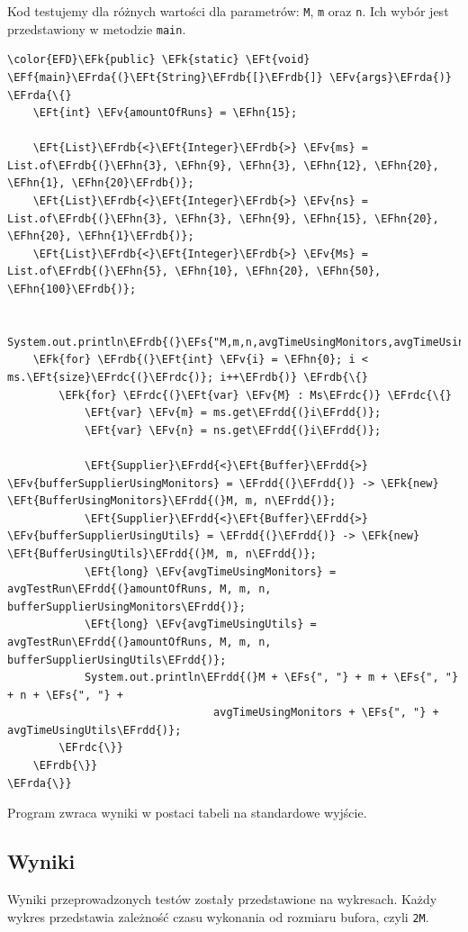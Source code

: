 \documentclass[11pt]{article}
\newcommand{\EFs}[1]{\textcolor{EFs}{#1}} %
\newcommand{\EFk}[1]{\textcolor{EFk}{#1}} %
\newcommand{\EFf}[1]{\textcolor{EFf}{#1}} %
\newcommand{\EFv}[1]{\textcolor{EFv}{#1}} %
\newcommand{\EFt}[1]{\textcolor{EFt}{#1}} %
\newcommand{\EFhn}[1]{\textcolor{EFhn}{#1}} %
\newcommand{\EFrda}[1]{#1} %
\newcommand{\EFrdb}[1]{\textcolor{EFrdb}{#1}} %
\newcommand{\EFrdc}[1]{\textcolor{EFrdc}{#1}} %
\newcommand{\EFrdd}[1]{\textcolor{EFrdd}{#1}} %
\begin{document}
Kod testujemy dla różnych wartości dla parametrów: \texttt{M}, \texttt{m} oraz \texttt{n}.
Ich wybór jest przedstawiony w metodzie \texttt{main}.
\begin{Code}
\begin{Verbatim}
\color{EFD}\EFk{public} \EFk{static} \EFt{void} \EFf{main}\EFrda{(}\EFt{String}\EFrdb{[}\EFrdb{]} \EFv{args}\EFrda{)} \EFrda{\{}
    \EFt{int} \EFv{amountOfRuns} = \EFhn{15};

    \EFt{List}\EFrdb{<}\EFt{Integer}\EFrdb{>} \EFv{ms} = List.of\EFrdb{(}\EFhn{3}, \EFhn{9}, \EFhn{3}, \EFhn{12}, \EFhn{20}, \EFhn{1}, \EFhn{20}\EFrdb{)};
    \EFt{List}\EFrdb{<}\EFt{Integer}\EFrdb{>} \EFv{ns} = List.of\EFrdb{(}\EFhn{3}, \EFhn{3}, \EFhn{9}, \EFhn{15}, \EFhn{20}, \EFhn{20}, \EFhn{1}\EFrdb{)};
    \EFt{List}\EFrdb{<}\EFt{Integer}\EFrdb{>} \EFv{Ms} = List.of\EFrdb{(}\EFhn{5}, \EFhn{10}, \EFhn{20}, \EFhn{50}, \EFhn{100}\EFrdb{)};

    System.out.println\EFrdb{(}\EFs{"M,m,n,avgTimeUsingMonitors,avgTimeUsingUtils"}\EFrdb{)};
    \EFk{for} \EFrdb{(}\EFt{int} \EFv{i} = \EFhn{0}; i < ms.\EFt{size}\EFrdc{(}\EFrdc{)}; i++\EFrdb{)} \EFrdb{\{}
        \EFk{for} \EFrdc{(}\EFt{var} \EFv{M} : Ms\EFrdc{)} \EFrdc{\{}
            \EFt{var} \EFv{m} = ms.get\EFrdd{(}i\EFrdd{)};
            \EFt{var} \EFv{n} = ns.get\EFrdd{(}i\EFrdd{)};

            \EFt{Supplier}\EFrdd{<}\EFt{Buffer}\EFrdd{>} \EFv{bufferSupplierUsingMonitors} = \EFrdd{(}\EFrdd{)} -> \EFk{new} \EFt{BufferUsingMonitors}\EFrdd{(}M, m, n\EFrdd{)};
            \EFt{Supplier}\EFrdd{<}\EFt{Buffer}\EFrdd{>} \EFv{bufferSupplierUsingUtils} = \EFrdd{(}\EFrdd{)} -> \EFk{new} \EFt{BufferUsingUtils}\EFrdd{(}M, m, n\EFrdd{)};
            \EFt{long} \EFv{avgTimeUsingMonitors} = avgTestRun\EFrdd{(}amountOfRuns, M, m, n, bufferSupplierUsingMonitors\EFrdd{)};
            \EFt{long} \EFv{avgTimeUsingUtils} = avgTestRun\EFrdd{(}amountOfRuns, M, m, n, bufferSupplierUsingUtils\EFrdd{)};
            System.out.println\EFrdd{(}M + \EFs{", "} + m + \EFs{", "} + n + \EFs{", "} +
                                avgTimeUsingMonitors + \EFs{", "} + avgTimeUsingUtils\EFrdd{)};
        \EFrdc{\}}
    \EFrdb{\}}
\EFrda{\}}
\end{Verbatim}
\end{Code}

Program zwraca wyniki w postaci tabeli na standardowe wyjście.
\subsection*{Wyniki}
\label{sec:org126c7d1}
Wyniki przeprowadzonych testów zostały przedstawione na wykresach.
Każdy wykres przedstawia zależność czasu wykonania od rozmiaru bufora, czyli \texttt{2M}.
\end{document}
